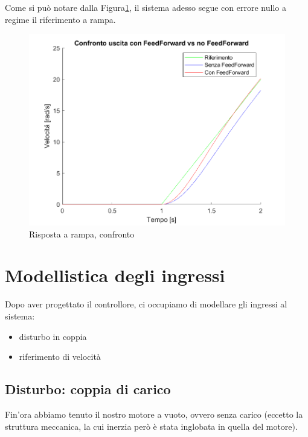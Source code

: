 \documentclass[a4paper,12pt]{article}
\begin{document}
\vspace{0.5cm}

Come si può notare dalla Figura\ref{fig: rispostaArampa}, il sistema adesso segue con errore nullo a regime il riferimento a rampa.

\vspace{0.5cm}
\begin{figure}[h!]
    \centering
    \includegraphics[scale = 0.60]{Immagini/PlotMatlab/rispostaRampaFF.png}
    \caption{Risposta a rampa, confronto}
    \label{fig: rispostaArampa}
\end{figure}

\newpage


\section{Modellistica degli ingressi}

Dopo aver progettato il controllore, ci occupiamo di modellare gli ingressi al sistema:

\begin{itemize}
    \item disturbo in coppia
    \item riferimento di velocità
\end{itemize}

\subsection{Disturbo: coppia di carico}

Fin'ora abbiamo tenuto il nostro motore a vuoto, ovvero senza carico (eccetto la struttura meccanica, la cui inerzia però è stata inglobata in quella del motore).
\end{document}

